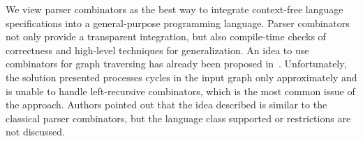 
We view parser combinators as the best way to integrate context-free language specifications into a general-purpose programming language. Parser combinators not only provide a transparent integration, but also compile-time checks of correctness and high-level techniques for generalization. An idea to use combinators for graph traversing has already been proposed in~\cite{ScalaGraphParsing}. Unfortunately, the solution presented processes cycles in the input graph only approximately and is unable to handle left-recursive combinators, which is the most common issue of the approach. Authors pointed out that the idea described is similar to the classical parser combinators, but the language class supported or restrictions are not discussed.



